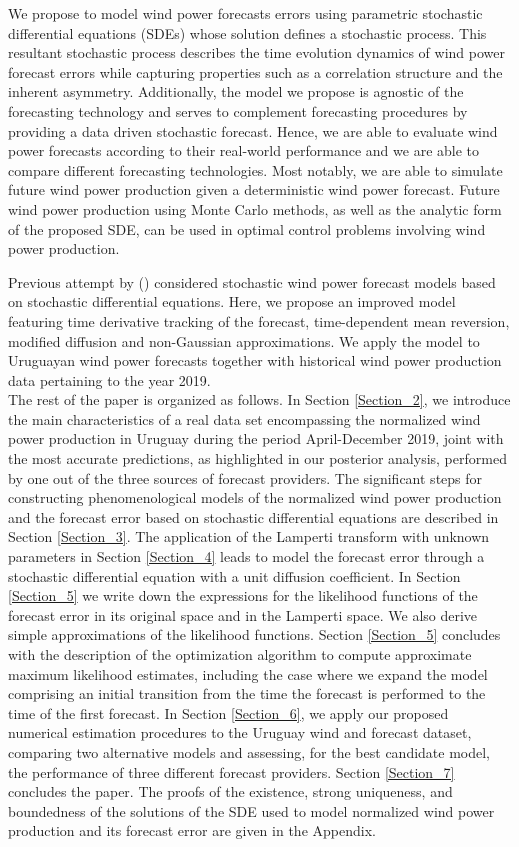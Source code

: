 \documentclass[11pt]{article}
\theoremstyle{definition}
\begin{document}
We propose to model wind power forecasts errors using parametric stochastic differential equations (SDEs) whose solution defines a stochastic process. This resultant stochastic process describes the time evolution dynamics of wind power forecast errors while capturing properties such as a correlation structure and the inherent asymmetry. Additionally, the model we propose is agnostic of the forecasting technology and serves to complement forecasting procedures by providing a data driven stochastic forecast. Hence, we are able to evaluate wind power forecasts according to their real-world performance and we are able to compare different forecasting technologies. Most notably, we are able to simulate future wind power production given a deterministic wind power forecast. Future wind power production using Monte Carlo methods, as well as the analytic form of the proposed SDE, can be used in optimal control problems involving wind power production.

Previous attempt by (\cite{mozuma}) considered stochastic wind power forecast models based on stochastic differential equations. Here, we propose an improved model featuring time derivative tracking of the forecast, time-dependent mean reversion, modified diffusion and non-Gaussian approximations. We apply the model to Uruguayan wind power forecasts together with historical wind power production data pertaining to the year 2019. \\

The rest of the paper is organized as follows. In Section \ref{Section_2}, we introduce the main characteristics of a real data set encompassing the normalized wind power production in Uruguay during the period April-December 2019, joint with the most accurate predictions, as highlighted in our posterior analysis, performed by one out of the three sources of forecast providers. The significant steps for constructing phenomenological models of the normalized wind power production and the forecast error based on stochastic differential equations are described in Section \ref{Section_3}. The application of the Lamperti transform with unknown parameters in Section \ref{Section_4} leads to model the forecast error through a stochastic differential equation with a unit diffusion coefficient. In Section \ref{Section_5} we write down the expressions for the likelihood functions of the forecast error in its original space and in the Lamperti space. We also derive simple approximations of the likelihood functions. Section \ref{Section_5} concludes with the description of the optimization algorithm to compute approximate maximum likelihood estimates, including the case where we expand the model comprising an initial transition from the time the forecast is performed to the time of the first forecast.  
In Section \ref{Section_6}, we apply our proposed numerical estimation procedures to the Uruguay wind and forecast dataset, comparing two alternative models and assessing, for the best candidate model, the performance of three different forecast providers. Section \ref{Section_7} concludes the paper. 
The proofs of the existence, strong uniqueness, and boundedness of the solutions of the SDE used to model normalized wind power production and its forecast error are given in the Appendix.
\end{document}
